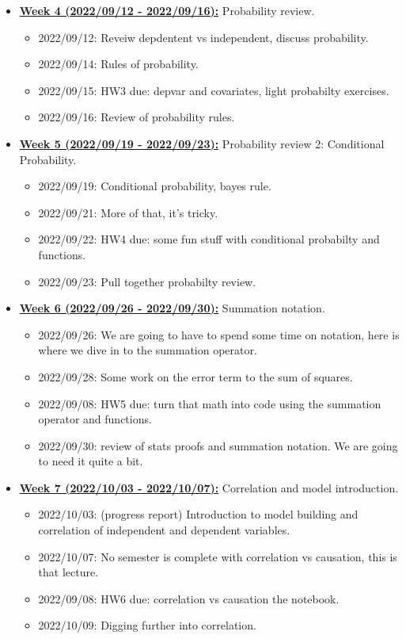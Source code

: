 \documentclass[11pt]{article}
\begin{document}
\begin{itemize}
  \item \underline{\textbf{Week 4 (2022/09/12 - 2022/09/16):}} Probability review. 
  \begin{itemize}
    \item 2022/09/12: Reveiw depdentent vs independent, discuss probability. 
    \item 2022/09/14: Rules of probability. 
    \item 2022/09/15: HW3 due: depvar and covariates, light probabilty exercises.
    \item 2022/09/16: Review  of probability rules. 
  \end{itemize}

  \item \underline{\textbf{Week 5 (2022/09/19 - 2022/09/23):}} Probability review 2: Conditional Probability.
  \begin{itemize}
    \item 2022/09/19: Conditional probability, bayes rule.
    \item 2022/09/21: More of that, it's tricky. 
    \item 2022/09/22: HW4 due: some fun stuff with conditional probabilty and functions.
    \item 2022/09/23: Pull together probabilty review. 
  \end{itemize}


  \item \underline{\textbf{Week 6 (2022/09/26 - 2022/09/30):}} Summation notation. 
  \begin{itemize}
    \item 2022/09/26: We are going to have to spend some time on notation, here is where we dive  in to the summation operator.
    \item 2022/09/28: Some work on the error term to the sum of squares. 
    \item 2022/09/08: HW5 due: turn that math into code using the summation operator and functions.
    \item 2022/09/30: review of stats proofs and summation notation. We are going to need it quite a bit. 
  \end{itemize}


  \item \underline{\textbf{Week 7 (2022/10/03 - 2022/10/07):}} Correlation and model introduction. 
  \begin{itemize}
    \item 2022/10/03: (progress report) Introduction to model building and correlation of independent and dependent variables.
    \item 2022/10/07: No semester is complete with correlation vs causation, this is that lecture. 
    \item 2022/09/08: HW6 due: correlation vs causation the notebook. 
    \item 2022/10/09: Digging further into correlation. 
  \end{itemize}


\end{itemize}
\end{document}
